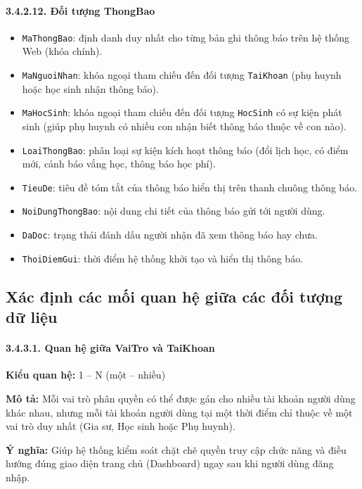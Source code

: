\paragraph{3.4.2.12. Đối tượng ThongBao}\mbox{}
\begin{itemize}\setlength{\itemsep}{2pt}\setlength{\parskip}{0pt}
    \item \texttt{MaThongBao}: định danh duy nhất cho từng bản ghi thông báo trên hệ thống Web (khóa chính).
    \item \texttt{MaNguoiNhan}: khóa ngoại tham chiếu đến đối tượng \texttt{TaiKhoan} (phụ huynh hoặc học sinh nhận thông báo).
    \item \texttt{MaHocSinh}: khóa ngoại tham chiếu đến đối tượng \texttt{HocSinh} có sự kiện phát sinh (giúp phụ huynh có nhiều con nhận biết thông báo thuộc về con nào).
    \item \texttt{LoaiThongBao}: phân loại sự kiện kích hoạt thông báo (đổi lịch học, có điểm mới, cảnh báo vắng học, thông báo học phí).
    \item \texttt{TieuDe}: tiêu đề tóm tắt của thông báo hiển thị trên thanh chuông thông báo.
    \item \texttt{NoiDungThongBao}: nội dung chi tiết của thông báo gửi tới người dùng.
    \item \texttt{DaDoc}: trạng thái đánh dấu người nhận đã xem thông báo hay chưa.
    \item \texttt{ThoiDiemGui}: thời điểm hệ thống khởi tạo và hiển thị thông báo.
\end{itemize}

\subsection{Xác định các mối quan hệ giữa các đối tượng dữ liệu}

\paragraph{3.4.3.1. Quan hệ giữa VaiTro và TaiKhoan}\mbox{}\par
\textbf{Kiểu quan hệ:} 1 -- N (một -- nhiều)\par
\textbf{Mô tả:} Mỗi vai trò phân quyền có thể được gán cho nhiều tài khoản người dùng khác nhau, nhưng mỗi tài khoản người dùng tại một thời điểm chỉ thuộc về một vai trò duy nhất (Gia sư, Học sinh hoặc Phụ huynh).\par
\textbf{Ý nghĩa:} Giúp hệ thống kiểm soát chặt chẽ quyền truy cập chức năng và điều hướng đúng giao diện trang chủ (Dashboard) ngay sau khi người dùng đăng nhập.

